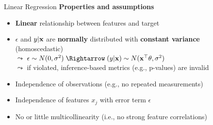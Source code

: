 \documentclass[11pt,compress,t,notes=noshow, aspectratio=169, xcolor=table]{beamer}
\begin{document}
\begin{frame}[c]{Linear Regression}
   \pause
    \textbf{Properties and assumptions}  
    \begin{itemize}[<+->]
    \item \textbf{Linear} relationship between features and target
    \item $\epsilon$ and $y \vert \xv$ are \textbf{normally} distributed with \textbf{constant variance} (homoscedastic)\\
    $\leadsto$ $\epsilon \sim N(0, \sigma^2) \; \Rightarrow \; (y \vert \xv) \sim N(\xv^\top \theta, \sigma^2)$\\
    $\leadsto$ if violated, inference-based metrics (e.g., p-values) are invalid
    \item Independence of observations (e.g., no repeated measurements) %
    \item Independence of features $x_j$ with error term $\epsilon$
    \item No or little multicollinearity (i.e., no strong feature correlations)
    \end{itemize}

\end{frame}
\end{document}
